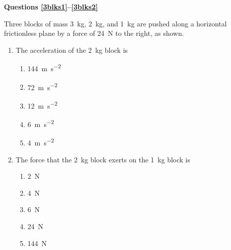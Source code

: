 \documentclass{../../../oss-apphys}
\begin{document}
\begin{multicols}{2}
  \textbf{Questions \ref{3blks1}--\ref{3blks2}}

  Three blocks of mass \SI{3}{\kilo\gram}, \SI{2}{\kilo\gram}, and
  \SI{1}{\kilo\gram} are pushed along a horizontal frictionless plane by a
  force of \SI{24}{\newton} to the right, as shown.
  \begin{center}
  \end{center}
  \begin{enumerate}[resume,leftmargin=18pt]
  \item The acceleration of the \SI{2}{\kilo\gram} block is
    \begin{enumerate}[noitemsep,topsep=0pt,leftmargin=18pt,label=(\Alph*)]
    \item\SI{144}{\metre\per\second^2}
    \item\SI{72 }{\metre\per\second^2}
    \item\SI{12 }{\metre\per\second^2}
    \item\SI{6  }{\metre\per\second^2}
    \item\SI{4  }{\metre\per\second^2}
    \end{enumerate}
    \label{3blks1}
    
  \item The force that the \SI{2}{\kilo\gram} block exerts on the
    \SI{1}{\kilo\gram} block is
    \begin{enumerate}[noitemsep,topsep=0pt,leftmargin=18pt,label=(\Alph*)]
    \item \SI{2}{\newton}
    \item \SI{4}{\newton}
    \item \SI{6}{\newton}
    \item \SI{24}{\newton}
    \item \SI{144}{\newton}
    \end{enumerate}
    \label{3blks2}
    

\end{enumerate}
\end{multicols}
\end{document}

